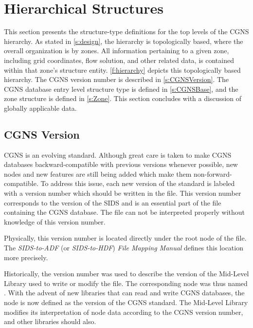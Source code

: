 \section{Hierarchical Structures}
\label{s:topo}
\thispagestyle{plain}

This section presents the structure-type definitions for the top levels
of the CGNS hierarchy.
As stated in \autoref{s:design}, the hierarchy is topologically
based, where the overall organization is by zones.
All information pertaining to a given zone, including grid coordinates,
flow solution, and other related data, is contained within that zone's
structure entity.
\autoref{f:hierarchy} depicts this topologically based hierarchy.
The CGNS version number is described in \autoref{s:CGNSVersion}.
The CGNS database entry level structure type is defined in
\autoref{s:CGNSBase}, and the zone structure is defined in
\autoref{s:Zone}.
This section concludes with a discussion of globally applicable data.

\subsection{CGNS Version}
\label{s:CGNSVersion}

CGNS is an evolving standard.
Although great care is taken to make CGNS databases backward-compatible
with previous versions whenever possible, new nodes and new features are
still being added which make them non-forward-compatible.
To address this issue, each new version of the standard is labeled with
a version number which should be written in the file.
This version number corresponds to the version of the SIDS and is an
essential part of the file containing the CGNS database.
The file can not be interpreted properly without knowledge of this
version number.

Physically, this version number is located directly under the root node
of the file.
The \textit{SIDS-to-ADF} (or \textit{SIDS-to-HDF}) \textit{File Mapping
Manual} defines this location more precisely.

Historically, the version number was used to describe the version of the
Mid-Level Library used to write or modify the file.
The corresponding node was thus named .
With the advent of new libraries that can read and write CGNS databases,
the node is now defined as the version of the CGNS standard.
The Mid-Level Library modifies its interpretation of node data according
to the CGNS version number, and other libraries should also.

